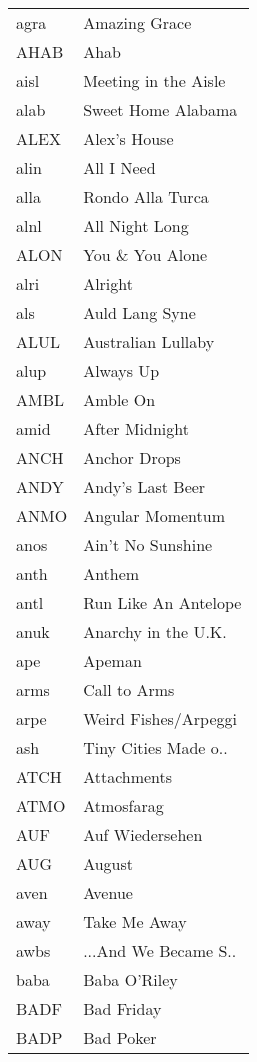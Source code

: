 \begin{supertabular}{ll}
 agra &         Amazing Grace \\
 AHAB &                  Ahab \\
 aisl &  Meeting in the Aisle \\
 alab &    Sweet Home Alabama \\
 ALEX &          Alex's House \\
 alin &            All I Need \\
 alla &      Rondo Alla Turca \\
 alnl &        All Night Long \\
 ALON &       You \& You Alone \\
 alri &               Alright \\
  als &        Auld Lang Syne \\
 ALUL &    Australian Lullaby \\
 alup &             Always Up \\
 AMBL &              Amble On \\
 amid &        After Midnight \\
 ANCH &          Anchor Drops \\
 ANDY &      Andy's Last Beer \\
 ANMO &      Angular Momentum \\
 anos &     Ain't No Sunshine \\
 anth &                Anthem \\
 antl &  Run Like An Antelope \\
 anuk &   Anarchy in the U.K. \\
  ape &                Apeman \\
 arms &          Call to Arms \\
 arpe &  Weird Fishes/Arpeggi \\
  ash &  Tiny Cities Made o.. \\
 ATCH &           Attachments \\
 ATMO &            Atmosfarag \\
  AUF &       Auf Wiedersehen \\
  AUG &                August \\
 aven &                Avenue \\
 away &          Take Me Away \\
 awbs &  ...And We Became S.. \\
 baba &          Baba O'Riley \\
 BADF &            Bad Friday \\
 BADP &             Bad Poker \\

\end{supertabular}
